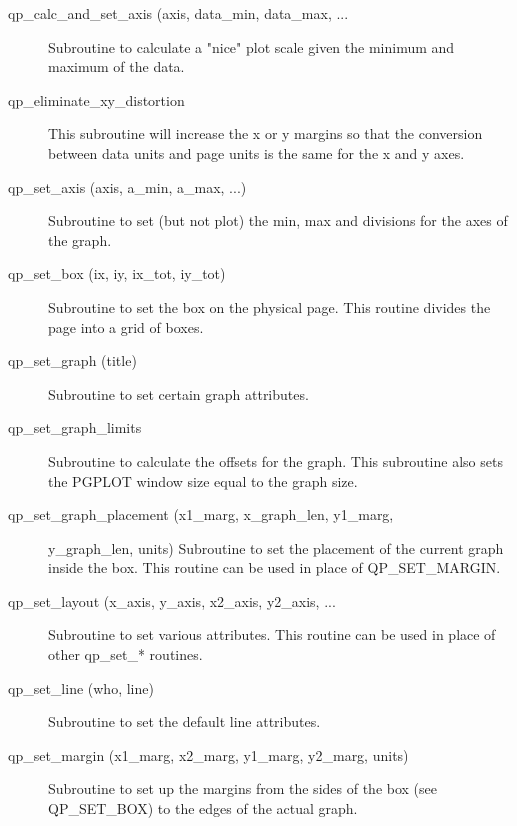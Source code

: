 \begin{description}

\item[qp_calc_and_set_axis (axis, data_min, data_max, ... ] \Newline
     Subroutine to calculate a "nice" plot scale given the minimum and maximum
     of the data. 

\item[qp_eliminate_xy_distortion] \Newline 
This subroutine will increase the x or y margins so that the conversion
between data units and page units is the same for the x and y axes.

\item[qp_set_axis (axis, a_min, a_max, ...)] \Newline
    Subroutine to set (but not plot) the min, max and divisions for the axes of the graph.

\item[qp_set_box (ix, iy, ix_tot, iy_tot) ] \Newline 
     Subroutine to set the box on the physical page.
     This routine divides the page into a grid of boxes. 

\item[qp_set_graph (title)] \Newline 
     Subroutine to set certain graph attributes.

\item[qp_set_graph_limits] \Newline 
     Subroutine to calculate the offsets for the graph.
     This subroutine also sets the PGPLOT window size equal to the graph size.

\item[qp_set_graph_placement (x1_marg, x_graph_len, y1_marg, ] \Newline 
                                                       y_graph_len, units)
Subroutine to set the placement of the current graph inside the box. 
This routine can be used in place of QP_SET_MARGIN.

\item[qp_set_layout (x_axis, y_axis, x2_axis, y2_axis, ...] \Newline 
     Subroutine to set various attributes. This routine can be used
     in place of other qp_set_* routines.

\item[qp_set_line (who, line)] \Newline 
     Subroutine to set the default line attributes.

\item[qp_set_margin (x1_marg, x2_marg, y1_marg, y2_marg, units)] \Newline 
Subroutine to set up the margins from the sides of the box (see QP_SET_BOX)
to the edges of the actual graph.


\end{description}
